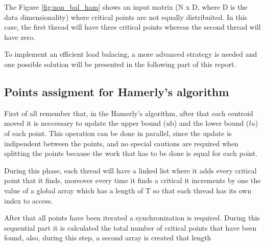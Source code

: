 \documentclass{report}
\begin{document}
\begin{minipage}[b]{0.48\textwidth}
    The Figure \ref{fig:non_bal_ham} shows an input matrix (N x D, where D is the data dimensionality) where critical points are not  equally distribuited. In this case, the first thread will have three critical points whereas the second thread will have zero.

    To implement an efficient load balacing, a more advanced strategy is needed and one possible solution will be presented in the following part of this report. 
    
    \subsection*{Points assigment for Hamerly's algorithm}
    First of all remember that, in the Hamerly's algorithm, after that each centroid moved it is neccessary to update the upper bound (ub) and the lower bound ($lu$) of each point. This operation can be done in parallel, since the update is indipendent between the points, and no special cautions are required when splitting the points because the work that has to be done is equal for each point. 

    During this phase, each thread will have a linked list where it adds every critical point that it finds, moreover every time it finds a critical it increments by one the value of a global array which has a length of T so that each thread has its own index to access.

    After that all points have been iterated a synchronization is required. During this sequential part it is calculated the total number of critical points that have been found, also, during this step, a second array is created that length
  \end{minipage}
  \hspace{0.15in}
\end{document}
